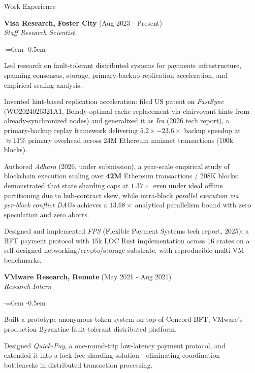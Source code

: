 \documentclass{resume}
\begin{document}
\begin{rSection}{Work Experience}
\label{sec:org738abe3}

\textbf{Visa Research, Foster City}  \hfill  (Aug 2023 - Present)\\
\emph{Staff Research Scientist}
\begin{list}{$\cdot$}{\leftmargin=0em}
\itemsep -0.5em \vspace{-0.5em}
 \item  Led research on fault-tolerant distributed systems for payments infrastructure, spanning consensus, storage, primary-backup replication acceleration, and empirical scaling analysis.
 \item  Invented hint-based replication acceleration: filed US patent on \emph{FastSync} (WO2024026321A1, Belady-optimal cache replacement via clairvoyant hints from already-synchronized nodes) and generalized it as \emph{Ira} (2026 tech report), a primary-backup replay framework delivering \textbf{$5.2\times-23.6\times$} backup speedup at \(\approx 11\%\) primary overhead across 24M Ethereum mainnet transactions (100k blocks).
 \item  Authored \emph{Adhara} (2026, under submission), a year-scale empirical study of blockchain execution scaling over \textbf{42M} Ethereum transactions / 208K blocks: demonstrated that state sharding caps at \textbf{$1.37\times$} even under ideal offline partitioning due to hub-contract skew, while intra-block \emph{parallel execution via per-block conflict DAGs} achieves a \textbf{$13.68\times$} analytical parallelism bound with zero speculation and zero aborts.
 \item  Designed and implemented \emph{FPS} (Flexible Payment Systems tech report, 2025): a BFT payment protocol with 15k LOC Rust implementation across 16 crates on a self-designed networking/crypto/storage substrate, with reproducible multi-VM benchmarks.
\end{list}
\vspace{0.5em}

\textbf{VMware Research, Remote}  \hfill  (May 2021 - Aug 2021)\\
\emph{Research Intern}
\begin{list}{$\cdot$}{\leftmargin=0em}
\itemsep -0.5em \vspace{-0.5em}
 \item  Built a prototype anonymous token system on top of Concord-BFT, VMware's production Byzantine fault-tolerant distributed platform.
 \item  Designed \emph{Quick-Pay}, a one-round-trip low-latency payment protocol, and extended it into a lock-free sharding solution---eliminating coordination bottlenecks in distributed transaction processing.
\end{list}
\vspace{0.5em}


\end{rSection}
\end{document}
